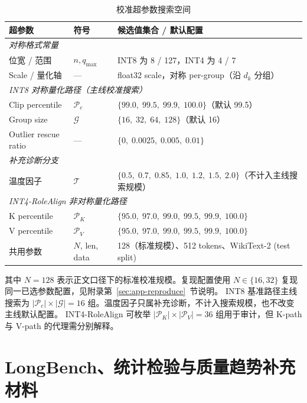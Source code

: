 \begin{table}[!htbp]
  \centering
  \caption{校准超参数搜索空间}
  \label{tab:app-search-space}
  \small
  \begin{tabular}{lll}
    \toprule
    超参数 & 符号 & 候选值集合 / 默认配置 \\
    \midrule
    \multicolumn{3}{l}{\textit{对称格式常量}} \\
    位宽 / 范围 & $n, q_{\max}$ & INT8 为 8 / 127，INT4 为 4 / 7 \\
    Scale / 量化轴 & --- & float32 scale，对称 per-group（沿 $d_k$ 分组） \\
    \midrule
    \multicolumn{3}{l}{\textit{INT8 对称量化路径（主线校准搜索）}} \\
    Clip percentile & $\mathcal{P}_c$ & $\{99.0,\; 99.5,\; 99.9,\; 100.0\}$（默认 99.5） \\
    Group size & $\mathcal{G}$ & $\{16,\; 32,\; 64,\; 128\}$（默认 16） \\
    Outlier rescue ratio & --- & $\{0,\; 0.0025,\; 0.005,\; 0.01\}$ \\
    \midrule
    \multicolumn{3}{l}{\textit{补充诊断分支}} \\
    温度因子 & $\mathcal{T}$ & $\{0.5,\; 0.7,\; 0.85,\; 1.0,\; 1.2,\; 1.5,\; 2.0\}$（不计入主线搜索规模） \\
    \midrule
    \multicolumn{3}{l}{\textit{INT4-RoleAlign 非对称量化路径}} \\
    K percentile & $\mathcal{P}_K$ & $\{95.0,\; 97.0,\; 99.0,\; 99.5,\; 99.9,\; 100.0\}$ \\
    V percentile & $\mathcal{P}_V$ & $\{95.0,\; 97.0,\; 99.0,\; 99.5,\; 99.9,\; 100.0\}$ \\
    \midrule
    共用参数 & $N$, len, data & 128（标准规模）、512 tokens、WikiText-2 (test split) \\
    \bottomrule
  \end{tabular}
\end{table}

其中 $N=128$ 表示正文口径下的标准校准规模。复现配置使用
$N\in\{16,32\}$ 复现同一已选参数配置，见附录第~\ref{sec:app-reproduce}~节说明。
INT8 基准路径主线搜索为 $|\mathcal{P}_c| \times |\mathcal{G}| = 16$ 组。温度因子只属补充诊断，不计入搜索规模，也不改变主线默认配置。
INT4-RoleAlign 可枚举 $|\mathcal{P}_K| \times |\mathcal{P}_V| = 36$ 组用于审计，但 K-path 与 V-path 的代理需分别解释。

\section{LongBench、统计检验与质量趋势补充材料}
\label{sec:app-longbench-full}

